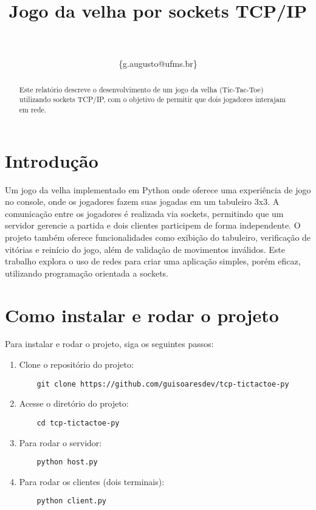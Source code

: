\documentclass[conference]{IEEEtran} %
\title{Jogo da velha por sockets TCP/IP} %
\author{\IEEEauthorblockN{Guilherme Augusto de Oliveira Soares} \\
\IEEEauthorblockA{Universidade Federal do Mato Grosso do Sul} \\
\{g.augusto@ufms.br\}} %
\begin{document}
\maketitle %

\begin{abstract}
Este relatório descreve o desenvolvimento de um jogo da velha (Tic-Tac-Toe) utilizando sockets TCP/IP, com o objetivo de permitir que dois jogadores interajam em rede.
\end{abstract}

\section{Introdução}

 Um jogo da velha implementado em Python onde oferece uma experiência de jogo no console, onde os jogadores fazem suas jogadas em um tabuleiro 3x3. A comunicação entre os jogadores é realizada via sockets, permitindo que um servidor gerencie a partida e dois clientes participem de forma independente. O projeto também oferece funcionalidades como exibição do tabuleiro, verificação de vitórias e reinício do jogo, além de validação de movimentos inválidos. Este trabalho explora o uso de redes para criar uma aplicação simples, porém eficaz, utilizando programação orientada a sockets.

\section{Como instalar e rodar o projeto}

Para instalar e rodar o projeto, siga os seguintes passos:

\begin{enumerate}
    \item Clone o repositório do projeto:
    \begin{verbatim}
    git clone https://github.com/guisoaresdev/tcp-tictactoe-py
    \end{verbatim}
    
    \item Acesse o diretório do projeto:
    \begin{verbatim}
    cd tcp-tictactoe-py
    \end{verbatim}
    
    \item Para rodar o servidor:
    \begin{verbatim}
    python host.py
    \end{verbatim}

    \item Para rodar os clientes (dois terminais):
    \begin{verbatim}
    python client.py
    \end{verbatim}
\end{enumerate}
\end{document}

